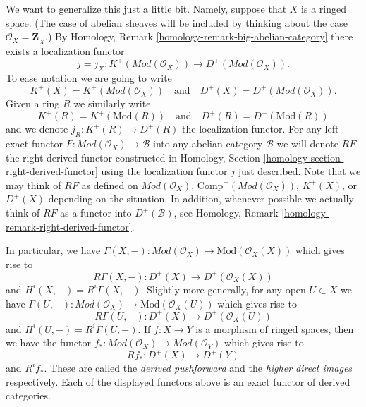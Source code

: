 \medskip\noindent
We want to generalize this just a little bit. Namely, suppose that $X$
is a ringed space. (The case of abelian sheaves will be included
by thinking about the case $\mathcal{O}_X = \underline{\mathbf{Z}}_X$.)
By Homology, Remark \ref{homology-remark-big-abelian-category} there exists a
localization functor
$$
j = j_X : K^{+}(\textit{Mod}(\mathcal{O}_X))
\longrightarrow
D^{+}(\textit{Mod}(\mathcal{O}_X)).
$$
To ease notation we are going to write
$$
K^{+}(X) = K^{+}(\textit{Mod}(\mathcal{O}_X))
\quad
\text{and}
\quad
D^{+}(X) = D^{+}(\textit{Mod}(\mathcal{O}_X)).
$$
Given a ring $R$ we similarly write
$$
K^{+}(R) = K^{+}(\text{Mod}(R))
\quad
\text{and}
\quad
D^{+}(R) = D^{+}(\text{Mod}(R))
$$
and we denote $j_R : K^{+}(R) \to D^{+}(R)$ the localization functor.
For any left exact functor $F : \textit{Mod}(\mathcal{O}_X) \to \mathcal{B}$
into any abelian category $\mathcal{B}$ we will denote $RF$ the
right derived functor constructed in
Homology, Section \ref{homology-section-right-derived-functor}
using the localization functor $j$ just described.
Note that we may think of $RF$ as defined on $\textit{Mod}(\mathcal{O}_X)$,
$\text{Comp}^{+}(\textit{Mod}(\mathcal{O}_X))$,
$K^{+}(X)$, or $D^{+}(X)$
depending on the situation. In addition, whenever possible
we actually think of $RF$ as a functor into $D^{+}(\mathcal{B})$, see
Homology, Remark \ref{homology-remark-right-derived-functor}.

\medskip\noindent
In particular, we have
$
\Gamma(X, -) :
\textit{Mod}(\mathcal{O}_X)
\longrightarrow
\text{Mod}(\mathcal{O}_X(X))
$
which gives rise to
$$
R\Gamma(X, -) :
D^{+}(X)
\longrightarrow
D^{+}(\mathcal{O}_X(X))
$$
and $H^i(X, -) = R^i\Gamma(X, -)$. Slightly more generally, for any open
$U \subset X$ we have
$
\Gamma(U, -) :
\textit{Mod}(\mathcal{O}_X)
\longrightarrow
\text{Mod}(\mathcal{O}_X(U))
$
which gives rise to
$$
R\Gamma(U, -) :
D^{+}(X)
\longrightarrow
D^{+}(\mathcal{O}_X(U))
$$
and $H^i(U, -) = R^i\Gamma(U, -)$.
If $f : X \to Y$ is a morphism of ringed spaces, then we have
the functor
$
f_* :
\textit{Mod}(\mathcal{O}_X)
\longrightarrow
\textit{Mod}(\mathcal{O}_Y)
$
which gives rise to
$$
Rf_* :
D^{+}(X)
\longrightarrow
D^{+}(Y)
$$
and $R^if_*$. These are called the
{\it derived pushforward} and the {\it higher direct images} respectively.
Each of the displayed functors above is an exact functor
of derived categories.

